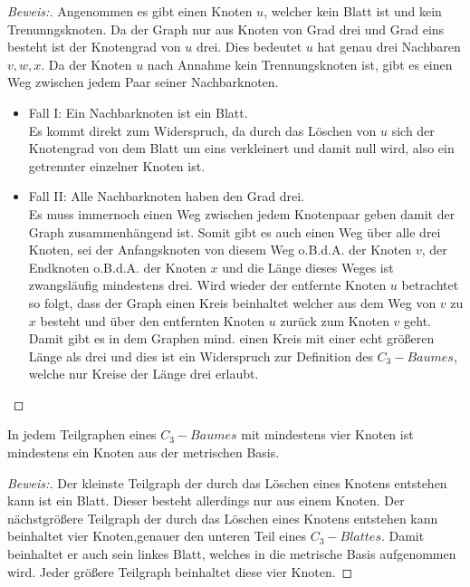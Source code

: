 \begin{proof}[Beweis:]
Angenommen es gibt einen Knoten $u$, welcher kein Blatt ist und kein Trenunngsknoten. Da der Graph nur aus Knoten von Grad drei und Grad eins besteht ist der Knotengrad von $u$ drei. Dies bedeutet $u$ hat genau drei Nachbaren $v,w,x$. Da
der Knoten $u$ nach Annahme kein Trennungsknoten ist, gibt es einen Weg zwischen jedem Paar seiner Nachbarknoten.
\begin{itemize}
\item Fall I: Ein Nachbarknoten ist ein Blatt.\\ Es kommt direkt zum Widerspruch, da durch das Löschen von $u$ sich der Knotengrad von dem Blatt um eins verkleinert und damit null wird, also ein getrennter einzelner Knoten ist.
\item Fall II: Alle Nachbarknoten haben den Grad drei.\\
Es muss immernoch einen Weg zwischen jedem Knotenpaar geben damit der Graph zusammenhängend ist. Somit gibt es auch einen Weg über alle drei Knoten, sei der Anfangsknoten von diesem Weg o.B.d.A. der Knoten $v$, der Endknoten o.B.d.A. der Knoten $x$ und die Länge dieses Weges ist zwangsläufig mindestens drei. Wird wieder der entfernte Knoten $u$ betrachtet so folgt, dass der Graph einen Kreis beinhaltet welcher aus dem Weg von $v$ zu $x$ besteht und über den entfernten Knoten $u$ zurück zum Knoten $v$ geht.\\
Damit gibt es in dem Graphen mind. einen Kreis mit einer echt größeren Länge als drei und dies ist ein Widerspruch zur Definition des $C_{3}-Baumes$, welche nur Kreise der Länge drei erlaubt.
\end{itemize}
\end{proof}
\begin{lem}
\label{bkb2}
In jedem Teilgraphen eines $C_{3}-Baumes$ mit mindestens vier Knoten ist mindestens ein Knoten aus der metrischen Basis.
\end{lem}
\begin{proof}[Beweis:]
Der kleinste Teilgraph der durch das Löschen eines Knotens entstehen kann ist ein Blatt. Dieser besteht allerdings nur aus einem Knoten. Der nächstgrößere Teilgraph der durch das Löschen eines Knotens entstehen kann beinhaltet vier Knoten,genauer den unteren Teil eines $C_{3}-Blattes$. Damit beinhaltet er auch sein linkes Blatt, welches in die metrische Basis aufgenommen wird. Jeder größere Teilgraph beinhaltet diese vier Knoten. %
\end{proof}
